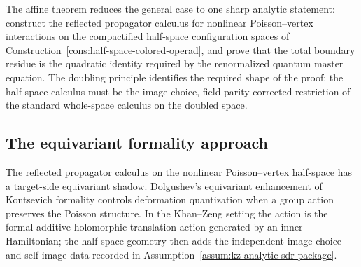 \begin{strategy}\label{str:remaining-general-case}
The affine theorem reduces the general case to one sharp analytic statement:
construct the reflected propagator calculus for nonlinear Poisson--vertex interactions on the compactified
half-space configuration spaces of Construction~\ref{cons:half-space-colored-operad}, and prove that the total
boundary residue is the quadratic identity required by the renormalized quantum master equation.
The doubling principle identifies the required shape of the proof: the
half-space calculus must be the image-choice, field-parity-corrected
restriction of the standard whole-space calculus on the doubled space.
\end{strategy}

\subsection{The equivariant formality approach}
\label{sec:equivariant-formality-approach}

The reflected propagator calculus on the nonlinear Poisson--vertex half-space has a target-side
equivariant shadow. Dolgushev's equivariant enhancement of Kontsevich formality controls deformation
quantization when a group action preserves the Poisson structure. In the Khan--Zeng setting the action is the
formal additive holomorphic-translation action generated by an inner Hamiltonian; the half-space geometry then
adds the independent image-choice and self-image data recorded in
Assumption~\ref{assum:kz-analytic-sdr-package}.

